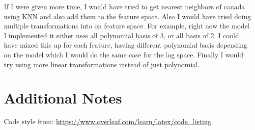 If I were given more time, I would have tried to get nearest neighbors of canada using KNN and also add them to the feature space. Also I would have tried doing multiple transformations into on feature space. For example, right now the model I implemented it either uses all polynomial basis of 3, or all basis of 2. I could have mixed this up for each feature, having different polynomial basis depending on the model which I would do the same case for the log space. Finally I would try using more linear transformations instead of just polynomial.

\section{Additional Notes}

Code style from: \url{https://www.overleaf.com/learn/latex/code_listing}

\newpage





